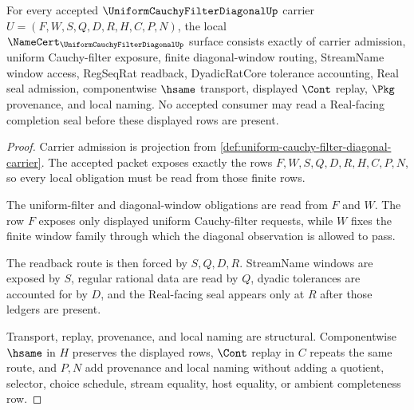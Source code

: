 \begin{theorem}
\label{thm:uniform-cauchy-filter-diagonal-namecert-obligations}
For every accepted $\UniformCauchyFilterDiagonalUp$ carrier $U=(F,W,S,Q,D,R,H,C,P,N)$, the local $\NameCert_{\UniformCauchyFilterDiagonalUp}$ surface consists exactly of carrier admission, uniform Cauchy-filter exposure, finite diagonal-window routing, StreamName window access, RegSeqRat readback, DyadicRatCore tolerance accounting, Real seal admission, componentwise $\hsame$ transport, displayed $\Cont$ replay, $\Pkg$ provenance, and local naming. No accepted consumer may read a Real-facing completion seal before these displayed rows are present.
\end{theorem}
\begin{proof}
Carrier admission is projection from \autoref{def:uniform-cauchy-filter-diagonal-carrier}. The accepted packet exposes exactly the rows $F,W,S,Q,D,R,H,C,P,N$, so every local obligation must be read from those finite rows.

The uniform-filter and diagonal-window obligations are read from $F$ and $W$. The row $F$ exposes only displayed uniform Cauchy-filter requests, while $W$ fixes the finite window family through which the diagonal observation is allowed to pass.

The readback route is then forced by $S,Q,D,R$. StreamName windows are exposed by $S$, regular rational data are read by $Q$, dyadic tolerances are accounted for by $D$, and the Real-facing seal appears only at $R$ after those ledgers are present.

Transport, replay, provenance, and local naming are structural. Componentwise $\hsame$ in $H$ preserves the displayed rows, $\Cont$ replay in $C$ repeats the same route, and $P,N$ add provenance and local naming without adding a quotient, selector, choice schedule, stream equality, host equality, or ambient completeness row.
\end{proof}

